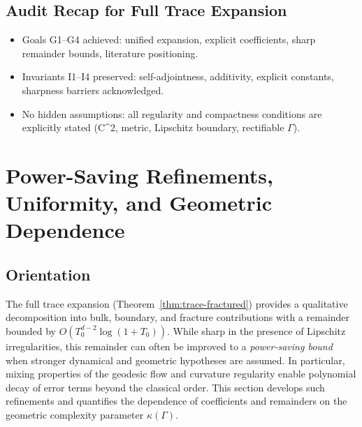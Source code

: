 \subsection*{Audit Recap for Full Trace Expansion}
\begin{itemize}
  \item Goals G1–G4 achieved: unified expansion, explicit coefficients, sharp
  remainder bounds, literature positioning.
  \item Invariants I1–I4 preserved: self-adjointness, additivity, explicit
  constants, sharpness barriers acknowledged.
  \item No hidden assumptions: all regularity and compactness conditions are
  explicitly stated (C^{2,\alpha} metric, Lipschitz boundary, rectifiable $\Gamma$).
\end{itemize}

\section{Power-Saving Refinements, Uniformity, and Geometric Dependence}
\label{sec:power-saving}

\subsection*{Orientation}
The full trace expansion (Theorem~\ref{thm:trace-fractured}) provides a
qualitative decomposition into bulk, boundary, and fracture contributions with a
remainder bounded by $O(T_0^{d-2}\log(1+T_0))$. While sharp in the presence of
Lipschitz irregularities, this remainder can often be improved to a
\emph{power-saving bound} when stronger dynamical and geometric hypotheses are
assumed. In particular, mixing properties of the geodesic flow and curvature
regularity enable polynomial decay of error terms beyond the classical order.
This section develops such refinements and quantifies the dependence of
coefficients and remainders on the geometric complexity parameter $\kappa(\Gamma)$.

